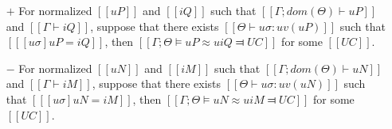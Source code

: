 \begin{lemma} \label{lemma:unification-completeness}
    \hfill
    \begin{itemize}
        \item [$+$] For normalized $[[uP]]$ and $[[iQ]]$ such that
        $[[Γ ; dom(Θ) ⊢ uP]]$ and $[[Γ ⊢ iQ]]$, 
        suppose that there exists $[[Θ ⊢ uσ : uv(uP)]]$ such that $[[ [uσ]uP = iQ ]]$,
        then $[[Γ ; Θ ⊨ uP ≈u iQ ⫤ UC]]$ for some $[[UC]]$.
        
        \item [$-$] For normalized $[[uN]]$ and $[[iM]]$ such that
        $[[Γ ; dom(Θ) ⊢  uN]]$ and $[[Γ ⊢ iM]]$,
        suppose that there exists $[[Θ ⊢ uσ : uv(uN)]]$ such that $[[ [uσ]uN = iM ]]$,
        then $[[Γ ; Θ ⊨ uN ≈u iM ⫤ UC]]$ for some $[[UC]]$.
   \end{itemize}
\end{lemma}
